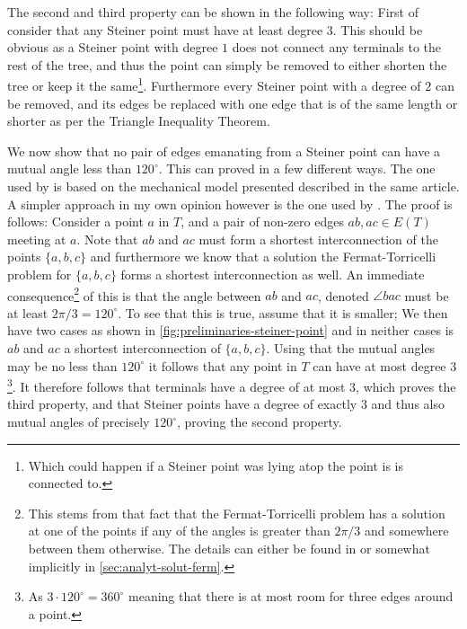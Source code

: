 The second and third property can be shown in the following way: First of consider that
any Steiner point must have at least degree $3$. This should be obvious as a
Steiner point with degree $1$ does not connect any terminals to the rest of the
tree, and thus the point can simply be removed to either shorten the tree or
keep it the same\footnote{Which could happen if a Steiner point was lying atop
  the point is is connected to.}. Furthermore every Steiner point with a degree
of $2$ can be removed, and its edges be replaced with one edge that is of the
same length or shorter as per the Triangle Inequality
Theorem\cite{triangleinequality}.

We now show that no pair of edges emanating from a Steiner point can have a
mutual angle less than $120^{\circ}$. This can proved in a few different
ways. The one used by \textcite{gilbert1968} is based on the mechanical model
presented described in the same article. A simpler approach in my own opinion
however is the one used by \textcite{brazil2015}. The proof is follows: Consider
a point $a$ in $T$, and a pair of non-zero edges $ab, ac \in E(T)$ meeting at
$a$. Note that $ab$ and $ac$ must form a shortest interconnection of the points
$\{a, b, c\}$ and furthermore we know that a solution the Fermat-Torricelli
problem for $\{ a, b, c \}$ forms a shortest interconnection as well. An
immediate consequence\footnote{This stems from that fact that the
  Fermat-Torricelli problem has a solution at one of the points if any of the
  angles is greater than $2 \pi / 3$ and somewhere between them otherwise. The
  details can either be found in \textcite[ch.~1]{brazil2015} or somewhat
  implicitly in \cref{sec:analyt-solut-ferm}.} of this is that the angle between
$ab$ and $ac$, denoted $\angle bac$ must be at least $2 \pi / 3 = 120^{\circ}$.
To see that this is true, assume that it is smaller; We then have two cases as
shown in \cref{fig:preliminaries-steiner-point} and in neither cases is $ab$ and
$ac$ a shortest interconnection of $\{a, b, c\}$.
%
%
Using that the mutual angles may be no less than $120^{\circ}$ it follows that
any point in $T$ can have at most degree $3$\footnote{As
$3 \cdot 120^{\circ} = 360^{\circ}$ meaning that there is at most room for three
edges around a point.}. It therefore follows that terminals have a degree of at
most $3$, which proves the third property, and that Steiner points have a
degree of exactly $3$ and thus also mutual angles of precisely $120^{\circ}$,
proving the second property.

